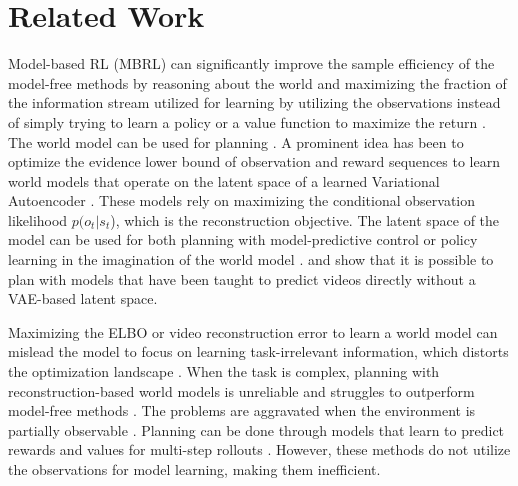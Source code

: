 \documentclass{article}
\theoremstyle{plain}
\theoremstyle{definition}
\theoremstyle{remark}
\begin{document}
\section{Related Work}
\label{sec:related_work}

Model-based RL (MBRL) can significantly improve the sample efficiency of the model-free methods by reasoning about the world and maximizing the fraction of the information stream utilized for learning by utilizing the observations instead of simply trying to learn a policy or a value function to maximize the return \cite{haRecurrentWorldModels2018}. The world model can be used for planning \cite{allen1983planning, basye1992decision}. A prominent idea has been to optimize the evidence lower bound of observation and reward sequences to learn world models that operate on the latent space of a learned Variational Autoencoder  \citep[VAE,][]{kingmaAutoEncoding2014, igl2018deep}. These models rely on maximizing the conditional observation likelihood $p(o_t | s_t$), which is the reconstruction objective. The latent space of the model can be used for both planning with model-predictive control \cite{rubinstein1997optimization, hafnerLearning2019} or policy learning in the imagination of the world model \cite{hafner2019dream}. \citet{finn2017deep} and \citet{ebert2018visual} show that it is possible to plan with models that have been taught to predict videos directly without a VAE-based latent space.

Maximizing the ELBO or video reconstruction error to learn a world model can mislead the model to focus on learning task-irrelevant information, which distorts the optimization landscape \cite{zhang2018natural,zintgraf2021varibad}. When the task is complex, planning with reconstruction-based world models is unreliable \cite{lutter2021learning} and struggles to outperform model-free methods \cite{kostrikov2020image, yarats2021mastering}. The problems are aggravated when the environment is partially observable \cite{morad2023popgym}. Planning can be done through models that learn to predict rewards and values for multi-step rollouts \cite {tamar2016value, silver2017predictron, oh2017value, schrittwieser2020mastering}. However, these methods do not utilize the observations for model learning, making them inefficient.
\end{document}

